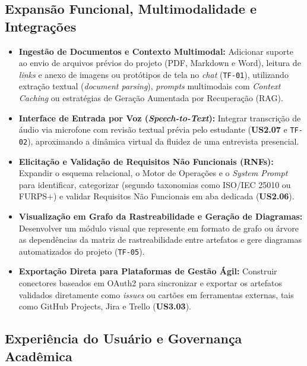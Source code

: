 \subsection*{Expansão Funcional, Multimodalidade e Integrações}

\begin{itemize}
    \item \textbf{Ingestão de Documentos e Contexto Multimodal:} Adicionar suporte ao envio de arquivos prévios do projeto (PDF, Markdown e Word), leitura de \textit{links} e anexo de imagens ou protótipos de tela no \textit{chat} (\texttt{TF-01}), utilizando extração textual (\textit{document parsing}), \textit{prompts} multimodais com \textit{Context Caching} ou estratégias de Geração Aumentada por Recuperação (RAG).
    \item \textbf{Interface de Entrada por Voz (\textit{Speech-to-Text}):} Integrar transcrição de áudio via microfone com revisão textual prévia pelo estudante (\textbf{US2.07} e \texttt{TF-02}), aproximando a dinâmica virtual da fluidez de uma entrevista presencial.
    \item \textbf{Elicitação e Validação de Requisitos Não Funcionais (RNFs):} Expandir o esquema relacional, o Motor de Operações e o \textit{System Prompt} para identificar, categorizar (segundo taxonomias como ISO/IEC 25010 ou FURPS+) e validar Requisitos Não Funcionais em aba dedicada (\textbf{US2.06}).
    \item \textbf{Visualização em Grafo da Rastreabilidade e Geração de Diagramas:} Desenvolver um módulo visual que represente em formato de grafo ou árvore as dependências da matriz de rastreabilidade entre artefatos e gere diagramas automatizados do projeto (\texttt{TF-05}).
    \item \textbf{Exportação Direta para Plataformas de Gestão Ágil:} Construir conectores baseados em OAuth2 para sincronizar e exportar os artefatos validados diretamente como \textit{issues} ou cartões em ferramentas externas, tais como GitHub Projects, Jira e Trello (\textbf{US3.03}).
\end{itemize}

\subsection*{Experiência do Usuário e Governança Acadêmica}

